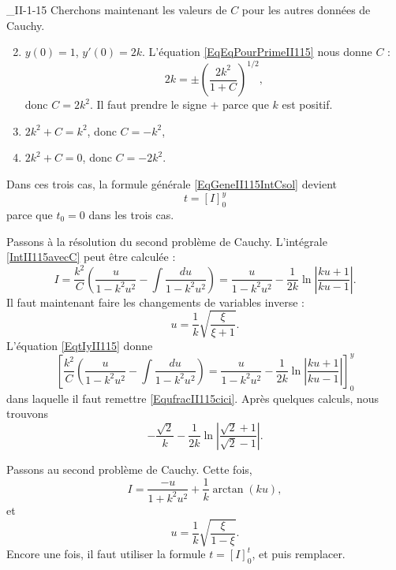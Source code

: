 \begin{corrige}{_II-1-15}
Cherchons maintenant les valeurs de $C$ pour les autres données de Cauchy.
\begin{enumerate}
\setcounter{enumi}{1}

\item
$y(0)=1$, $y'(0)=2k$.
L'équation \eqref{EqEqPourPrimeII115} nous donne $C$ :
\begin{equation}
	2k=\pm\left( \frac{ 2k^2 }{ 1+C } \right)^{1/2},
\end{equation}
donc $C=2k^2$. Il faut prendre le signe $+$ parce que $k$ est positif.

\item
$2k^2+C=k^2$, donc $C=-k^2$,
\item
$2k^2+C=0$, donc $C=-2k^2$.

\end{enumerate}
Dans ces trois cas, la formule générale \eqref{EqGeneII115IntCsol} devient
\begin{equation}		\label{EqtIyII115}
	t=[I]_0^y
\end{equation}
parce que $t_0=0$ dans les trois cas.

Passons à la résolution du second problème de Cauchy. L'intégrale \eqref{IntII115avecC} peut être calculée :
\begin{equation}
	I=\frac{ k^2 }{ C }\left( \frac{ u }{ 1-k^2u^2 }  -\int\frac{ du }{ 1-k^2u^2 } \right)=\frac{ u }{ 1-k^2u^2 }-\frac{1}{ 2k }\ln\left| \frac{ ku+1 }{ ku-1 } \right|.
\end{equation}
Il faut maintenant faire les changements de variables  inverse :
\begin{equation}		\label{EqufracII115cici}
	u=\frac{1}{ k }\sqrt{\frac{ \xi }{ \xi+1 }}.
\end{equation}
L'équation \eqref{EqtIyII115} donne
\begin{equation}
	\left[\frac{ k^2 }{ C }\left( \frac{ u }{ 1-k^2u^2 }  -\int\frac{ du }{ 1-k^2u^2 } \right)=\frac{ u }{ 1-k^2u^2 }-\frac{1}{ 2k }\ln\left| \frac{ ku+1 }{ ku-1 } \right|\right]_0^y
\end{equation}
dans laquelle il faut remettre \eqref{EqufracII115cici}. Après quelques calculs, nous trouvons
\begin{equation}
	-\frac{ \sqrt{2} }{ k }-\frac{1}{ 2k }\ln\left| \frac{ \sqrt{2}+1 }{ \sqrt{2}-1 } \right|.
\end{equation}

Passons au second problème de Cauchy. Cette fois,
\begin{equation}
	I=\frac{ -u }{ 1+k^2u^2 }+\frac{1}{ k }\arctan(ku),
\end{equation}
et 
\begin{equation}
	u=\frac{1}{ k }\sqrt{\frac{ \xi }{ 1-\xi }}.
\end{equation}
Encore une fois, il faut utiliser la formule $t=[I]_0^t$, et puis remplacer.



\end{corrige}
